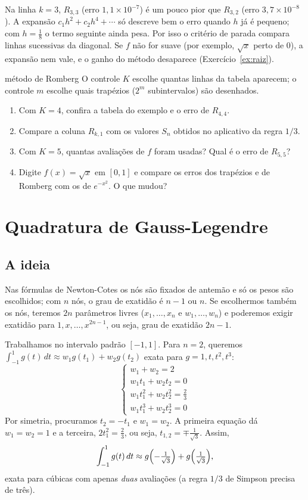 \begin{observacao}
Na linha $k=3$, $R_{3,3}$ (erro $1{,}1\times10^{-7}$) é um pouco pior que $R_{3,2}$ (erro
$3{,}7\times10^{-8}$). A expansão $c_1h^2+c_2h^4+\cdots$ só descreve bem o erro quando $h$ já
é pequeno; com $h=\frac18$ o termo seguinte ainda pesa. Por isso o critério de parada compara
linhas sucessivas da diagonal. Se $f$ não for suave (por exemplo, $\sqrt x$ perto de $0$), a
expansão nem vale, e o ganho do método desaparece (Exercício~\ref{ex:raiz}).
\end{observacao}

\begin{atividade}{método de Romberg}{\arqRomberg}
O controle $K$ escolhe quantas linhas da tabela aparecem; o controle $m$ escolhe quais
trapézios ($2^m$ subintervalos) são desenhados.
\begin{enumerate}[nosep]
  \item Com $K=4$, confira a tabela do exemplo e o erro de $R_{4,4}$.
  \item Compare a coluna $R_{k,1}$ com os valores $S_n$ obtidos no aplicativo da regra $1/3$.
  \item Com $K=5$, quantas avaliações de $f$ foram usadas? Qual é o erro de $R_{5,5}$?
  \item Digite $f(x)=\sqrt{x}$ em $[0,1]$ e compare os erros dos trapézios e de Romberg com os
        de $e^{-x^2}$. O que mudou?
\end{enumerate}
\end{atividade}

\section{Quadratura de Gauss-Legendre}

\subsection{A ideia}

Nas fórmulas de Newton-Cotes os nós são fixados de antemão e só os pesos são escolhidos;
com $n$ nós, o grau de exatidão é $n-1$ ou $n$. Se escolhermos também os nós, teremos $2n$
parâmetros livres ($x_1,\dots,x_n$ e $w_1,\dots,w_n$) e poderemos exigir exatidão para
$1,x,\dots,x^{2n-1}$, ou seja, grau de exatidão $2n-1$.

Trabalhamos no intervalo padrão $[-1,1]$. Para $n=2$, queremos
$\int_{-1}^{1}g(t)\,dt\approx w_1g(t_1)+w_2g(t_2)$ exata para $g=1,t,t^2,t^3$:
\[
\begin{cases}
w_1+w_2=2\\
w_1t_1+w_2t_2=0\\
w_1t_1^2+w_2t_2^2=\frac23\\
w_1t_1^3+w_2t_2^3=0
\end{cases}
\]
Por simetria, procuramos $t_2=-t_1$ e $w_1=w_2$. A primeira equação dá $w_1=w_2=1$ e a
terceira, $2t_1^2=\frac23$, ou seja, $t_{1,2}=\mp\frac{1}{\sqrt3}$. Assim,
\[
\int_{-1}^{1}g(t)\,dt\approx g\Bigl(-\tfrac{1}{\sqrt3}\Bigr)+g\Bigl(\tfrac{1}{\sqrt3}\Bigr),
\]
exata para cúbicas com apenas \emph{duas} avaliações (a regra $1/3$ de Simpson precisa de três).

